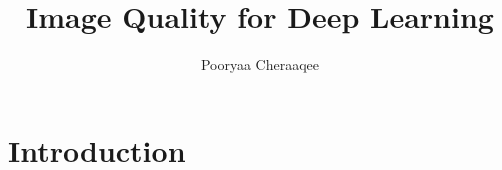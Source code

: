 \documentclass{article}
\begin{document}
\title{Image Quality for Deep Learning}
\author{Pooryaa Cheraaqee}
\maketitle


\section{Introduction} \label{sec:introductoin}




\end{document}

